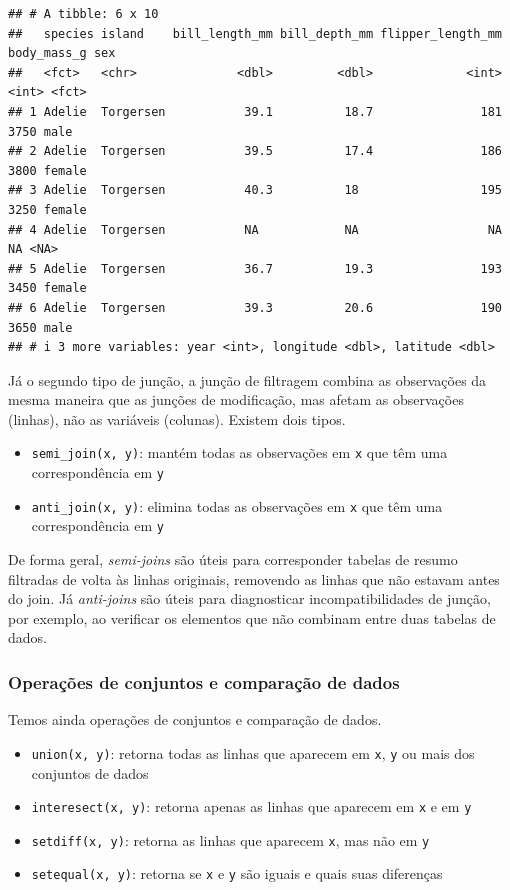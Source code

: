\documentclass[
]{article}
\providecommand{\tightlist}{%
  \setlength{\itemsep}{0pt}\setlength{\parskip}{0pt}}
\begin{document}
\begin{verbatim}
## # A tibble: 6 x 10
##   species island    bill_length_mm bill_depth_mm flipper_length_mm body_mass_g sex   
##   <fct>   <chr>              <dbl>         <dbl>             <int>       <int> <fct> 
## 1 Adelie  Torgersen           39.1          18.7               181        3750 male  
## 2 Adelie  Torgersen           39.5          17.4               186        3800 female
## 3 Adelie  Torgersen           40.3          18                 195        3250 female
## 4 Adelie  Torgersen           NA            NA                  NA          NA <NA>  
## 5 Adelie  Torgersen           36.7          19.3               193        3450 female
## 6 Adelie  Torgersen           39.3          20.6               190        3650 male  
## # i 3 more variables: year <int>, longitude <dbl>, latitude <dbl>
\end{verbatim}

Já o segundo tipo de junção, a junção de filtragem combina as observações da mesma maneira que as junções de modificação, mas afetam as observações (linhas), não as variáveis (colunas). Existem dois tipos.

\begin{itemize}
\tightlist
\item
  \texttt{semi\_join(x,\ y)}: mantém todas as observações em \texttt{x} que têm uma correspondência em \texttt{y}
\item
  \texttt{anti\_join(x,\ y)}: elimina todas as observações em \texttt{x} que têm uma correspondência em \texttt{y}
\end{itemize}

De forma geral, \emph{semi-joins} são úteis para corresponder tabelas de resumo filtradas de volta às linhas originais, removendo as linhas que não estavam antes do join. Já \emph{anti-joins} são úteis para diagnosticar incompatibilidades de junção, por exemplo, ao verificar os elementos que não combinam entre duas tabelas de dados.

\hypertarget{operauxe7uxf5es-de-conjuntos-e-comparauxe7uxe3o-de-dados}{%
\subsubsection{Operações de conjuntos e comparação de dados}\label{operauxe7uxf5es-de-conjuntos-e-comparauxe7uxe3o-de-dados}}

Temos ainda operações de conjuntos e comparação de dados.

\begin{itemize}
\tightlist
\item
  \texttt{union(x,\ y)}: retorna todas as linhas que aparecem em \texttt{x}, \texttt{y} ou mais dos conjuntos de dados
\item
  \texttt{interesect(x,\ y)}: retorna apenas as linhas que aparecem em \texttt{x} e em \texttt{y}
\item
  \texttt{setdiff(x,\ y)}: retorna as linhas que aparecem \texttt{x}, mas não em \texttt{y}
\item
  \texttt{setequal(x,\ y)}: retorna se \texttt{x} e \texttt{y} são iguais e quais suas diferenças
\end{itemize}
\end{document}
